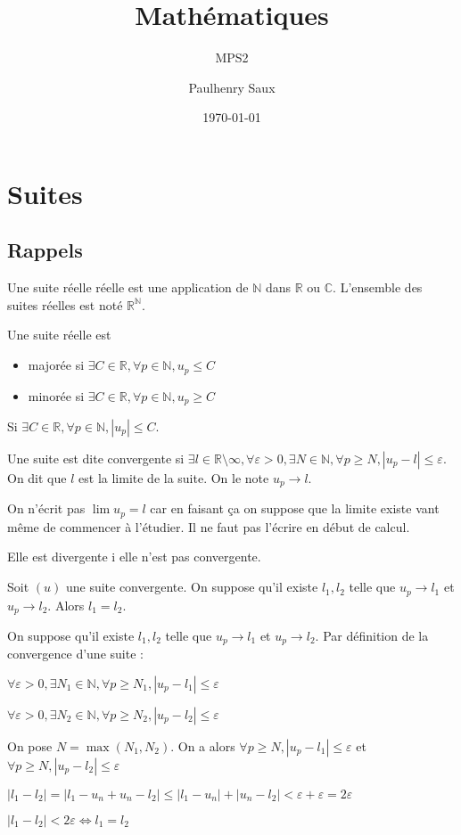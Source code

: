 \documentclass[french]{yLectureNote}
\title{Mathématiques}
\subtitle{MPS2}
\author{Paulhenry Saux}
\date{\today}
\newcommand{\N}[0]{\mathbb{N}}
\newcommand{\R}[0]{\mathbb{R}}
\newcommand{\C}[0]{\mathbb{C}}
\begin{document}

	\chapter{Suites}
\section{Rappels}
\begin{definition}
Une suite réelle réelle est une application de $\N$ dans $\R$ ou $\C$. L'ensemble des suites réelles est noté $\R^{\N}$.
\end{definition}
\begin{definition}
Une suite réelle est \begin{itemize}
               \item majorée si $\exists C\in\R, \forall p\in\N,u_p \leq C$
               \item minorée si $\exists C\in\R, \forall p\in\N,u_p \geq C$
              \end{itemize}

\end{definition}
\begin{definition}
Si $\exists C\in\R, \forall p\in\N, |u_p|\leq C$.
\end{definition}
\begin{definition}
Une suite est dite convergente si $\exists l\in\R \setminus {\infty}, \forall \varepsilon >0,\exists N\in\N, \forall p\geq N, |u_p-l|\leq \varepsilon$. On dit que $l$ est la limite de la suite. On le note $u_p \to l$.
\end{definition}
On n'écrit pas $\lim u_p = l$ car en faisant ça on suppose que la limite existe vant m\^eme de commencer à l'étudier. Il ne faut pas l'écrire en début de calcul.
\begin{definition}
Elle est divergente i elle n'est pas convergente.
\end{definition}
\begin{proposition}
Soit $(u)$ une suite convergente. On suppose qu'il existe $l_1,l_2$ telle que $u_p\to l_1$ et $u_p\to l_2$. Alors $l_1=l_2$.
\end{proposition}
\begin{myproof}
On suppose qu'il existe $l_1,l_2$ telle que $u_p\to l_1$ et $u_p\to l_2$. Par définition de la convergence d'une suite :

$\forall \varepsilon >0,\exists N_1\in\N, \forall p\geq N_1, |u_p-l_1|\leq \varepsilon$

$\forall \varepsilon >0,\exists N_2\in\N, \forall p\geq N_2, |u_p-l_2|\leq \varepsilon$

On pose $N=\max(N_1,N_2)$. On a alors $\forall p\geq N, |u_p-l_1|\leq \varepsilon$ et $\forall p\geq N, |u_p-l_2|\leq \varepsilon$

$|l_1-l_2| = |l_1-u_n+u_n-l_2|\leq |l_1-u_n|+|u_n-l_2| < \varepsilon + \varepsilon = 2 \varepsilon$

$|l_1-l_2| < 2\varepsilon \iff l_1=l_2$
\end{myproof}
\end{document}
